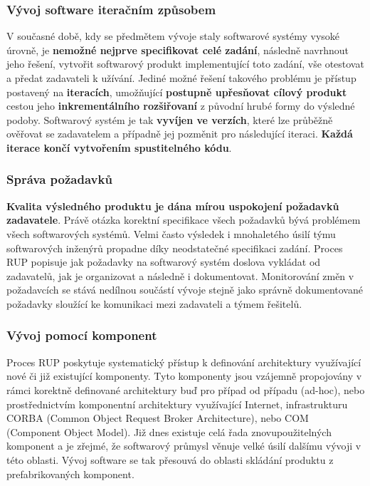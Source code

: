 \subsubsection{Vývoj software iteračním způsobem}
V současné době, kdy se předmětem vývoje staly softwarové systémy vysoké úrovně, je \textbf{nemožné nejprve specifikovat celé zadání}, následně navrhnout jeho řešení, vytvořit softwarový produkt implementující toto zadání, vše otestovat a předat zadavateli k užívání. Jediné možné řešení takového problému je přístup postavený na \textbf{iteracích}, umožňující \textbf{postupně upřesňovat cílový produkt} cestou jeho \textbf{inkrementálního rozšiřovaní} z původní hrubé formy do výsledné podoby.  Softwarový systém je tak \textbf{vyvíjen ve verzích}, které lze průběžně ověřovat se zadavatelem a případně jej pozměnit pro následující iteraci. \textbf{Každá iterace končí vytvořením spustitelného kódu}.

\subsubsection{Správa požadavků}
\textbf{Kvalita výsledného produktu je dána mírou uspokojení požadavků zadavatele}. Právě otázka korektní specifikace všech požadavků bývá problémem všech softwarových systémů. Velmi často výsledek i mnohaletého úsilí týmu softwarových inženýrů propadne díky neodstatečné specifikaci zadání. Proces RUP popisuje jak požadavky na softwarový systém doslova vykládat od zadavatelů, jak je organizovat a následně i dokumentovat. Monitorování změn v požadavcích se stává nedílnou součástí vývoje stejně jako správně dokumentované požadavky sloužící ke komunikaci mezi zadavateli a týmem řešitelů.

\subsubsection{Vývoj pomocí komponent}
Proces RUP poskytuje systematický přístup k definování architektury využívající nové či již existující komponenty. Tyto komponenty jsou vzájemně propojovány v rámci korektně definované architektury buď pro případ od případu (ad-hoc), nebo prostřednictvím komponentní architektury využívající Internet, infrastrukturu CORBA (Common Object Request Broker Architecture), nebo COM (Component Object Model). Již dnes existuje celá řada znovupoužitelných komponent a je zřejmé, že softwarový průmysl věnuje velké úsilí dalšímu vývoji v této oblasti. Vývoj software se tak přesouvá do oblasti skládání produktu z prefabrikovaných komponent.

